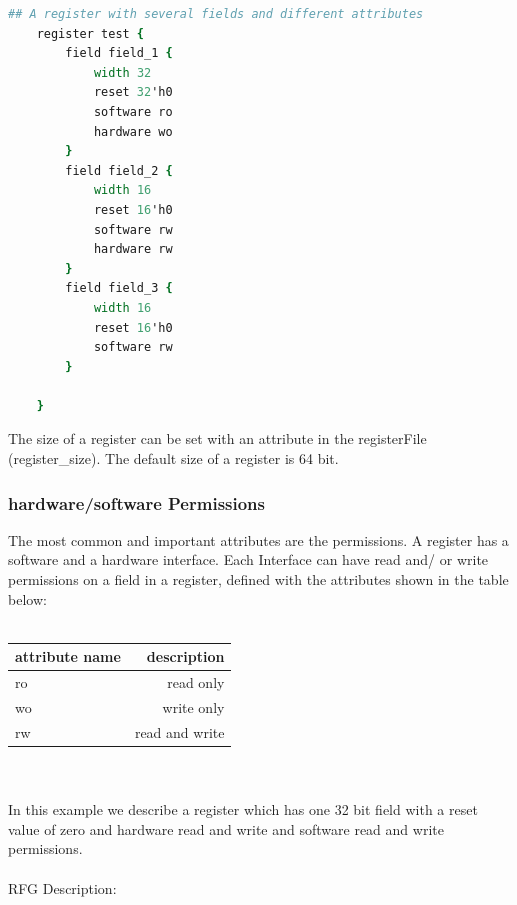 \documentclass[12pt,a4paper]{article}
\begin{document}
\begin{lstlisting}[linewidth=\textwidth,language=tcl,basicstyle=\small,tabsize=4]
    ## A register with several fields and different attributes
    register test {
        field field_1 {
            width 32
            reset 32'h0
            software ro
            hardware wo
        }
        field field_2 {
            width 16
            reset 16'h0
            software rw
            hardware rw
        }
        field field_3 {
            width 16
            reset 16'h0
            software rw
        }

    }
\end{lstlisting}

The size of a register can be set with an attribute in the registerFile (register\_size). The default size of a register is 64 bit.

\newpage

\subsubsection{hardware/software Permissions}

The most common and important attributes are the permissions. A register has a software and a hardware interface. Each Interface can have read and/ or write permissions on a field in a register, defined with the attributes shown in the table below:\\
\\
\begin{tabular}{ l | r }
attribute name & description \\ \hline
ro & read only \\ \hline
wo & write only \\ \hline
rw & read and write \\ \hline
\end{tabular}
\\
\\
In this example we describe a register which has one 32 bit field with a reset value of zero and hardware read and write and software read and write permissions.\\
\\
RFG Description:

\end{document}
